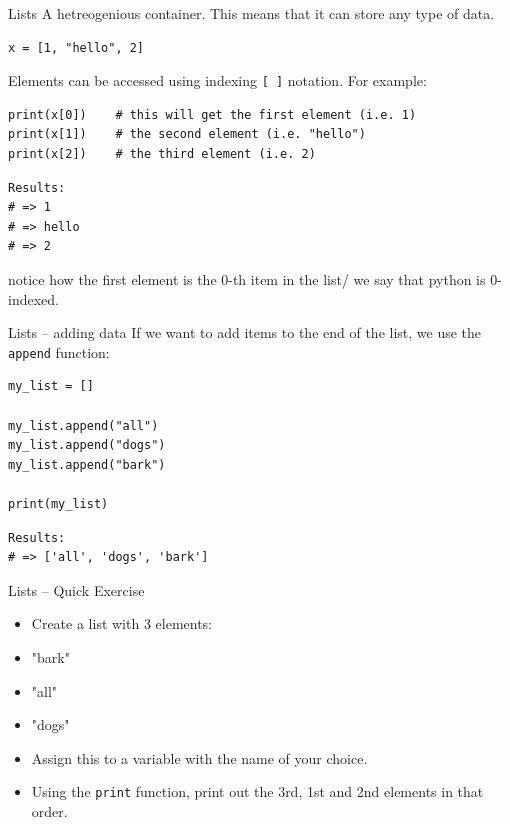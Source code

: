\documentclass[10pt]{beamer}
\begin{document}
\begin{frame}[label={sec:org4b8a41a},fragile]{Lists}
 A hetreogenious container. This means that it can store any type of data.

\begin{verbatim}
x = [1, "hello", 2]
\end{verbatim}

Elements can be accessed using indexing \texttt{[ ]} notation. For example:

\begin{verbatim}
print(x[0])    # this will get the first element (i.e. 1)
print(x[1])    # the second element (i.e. "hello")
print(x[2])    # the third element (i.e. 2)
\end{verbatim}

\begin{verbatim}
Results: 
# => 1
# => hello
# => 2
\end{verbatim}


\alert{notice how the first element is the 0-th item in the list/} we say that python is
0-indexed.
\end{frame}

\begin{frame}[label={sec:orgb950cac},fragile]{Lists -- adding data}
 If we want to add items to the end of the list, we use the \texttt{append} function:

\begin{verbatim}
my_list = []

my_list.append("all")
my_list.append("dogs")
my_list.append("bark")

print(my_list)
\end{verbatim}

\begin{verbatim}
Results: 
# => ['all', 'dogs', 'bark']
\end{verbatim}
\end{frame}

\begin{frame}[label={sec:orgda52762},fragile]{Lists -- Quick Exercise}
 \begin{itemize}
\item Create a list with 3 elements:

\item "bark"
\item "all"
\item "dogs"

\item Assign this to a variable with the name of your choice.
\item Using the \texttt{print} function, print out the 3rd, 1st and 2nd elements in that order.
\end{itemize}
\end{frame}
\end{document}
